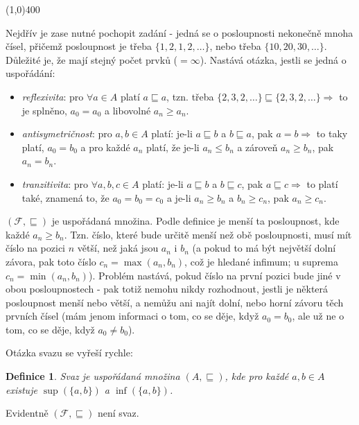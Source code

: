 \documentclass{article}
\newtheorem{definice}{Definice}[section]
\begin{document}
\line(1,0){400}

Nejdřív je zase nutné pochopit zadání - jedná se o posloupnosti nekonečně mnoha čísel, přičemž posloupnost je třeba $\{1,2,1,2,\ldots\}$, nebo třeba $\{10,20,30,\ldots\}$. Důležité je, že mají stejný počet prvků ($=\infty$). Nastává otázka, jestli se jedná o uspořádání:

\begin{itemize}
 \item \emph{reflexivita}: pro $\forall a \in A$ platí $a \sqsubseteq a$, tzn. třeba $\{2,3,2,\ldots\} \sqsubseteq \{2,3,2,\ldots\} \Rightarrow$ to je splněno, $a_0 = a_0$ a libovolné $a_n \geq a_n$.
 \item \emph{antisymetričnost}: pro $a,b \in A$ platí: je-li $a \sqsubseteq b$ a $b \sqsubseteq a$, pak $a = b \Rightarrow$ to taky platí, $a_0 = b_0$ a pro každé $a_n$ platí, že je-li $a_n \leq b_n$ a zároveň $a_n \geq b_n$, pak $a_n = b_n$.
 \item \emph{tranzitivita}:  pro $\forall a,b,c \in A$ platí: je-li $a \sqsubseteq b$ a $b \sqsubseteq c$, pak $a \sqsubseteq c \Rightarrow$ to platí také, znamená to, že $a_0 = b_0 = c_0$ a je-li $a_n \geq b_n$ a $b_n \geq c_n$, pak $a_n \geq c_n$. 
\end{itemize} 

$(\mathcal{F},\sqsubseteq)$ je uspořádaná množina. Podle definice je menší ta posloupnost, kde každé $a_n \geq b_n$. Tzn. číslo, které bude určitě menší než obě posloupnosti, musí mít číslo na pozici $n$ větší, než jaká jsou $a_n$ i $b_n$ (a pokud to má být největší dolní závora, pak toto číslo $c_n = \max(a_n, b_n)$, což je hledané infimum; u suprema $c_n = \min(a_n, b_n)$). Problém nastává, pokud číslo na první pozici bude jiné v obou posloupnostech - pak totiž nemohu nikdy rozhodnout, jestli je některá posloupnost menší nebo větší, a nemůžu ani najít dolní, nebo horní závoru těch prvních čísel (mám jenom informaci o tom, co se děje, když $a_0 = b_0$, ale už ne o tom, co se děje, když $a_0 \neq b_0$). 

Otázka svazu se vyřeší rychle:

\begin{definice}
Svaz je uspořádaná množina $(A,\sqsubseteq)$, kde pro každé $a,b \in A$ existuje $\sup(\{a,b\})$ a $\inf(\{a,b\})$. 
\end{definice}

Evidentně $(\mathcal{F},\sqsubseteq)$ není svaz.

\end{document}

